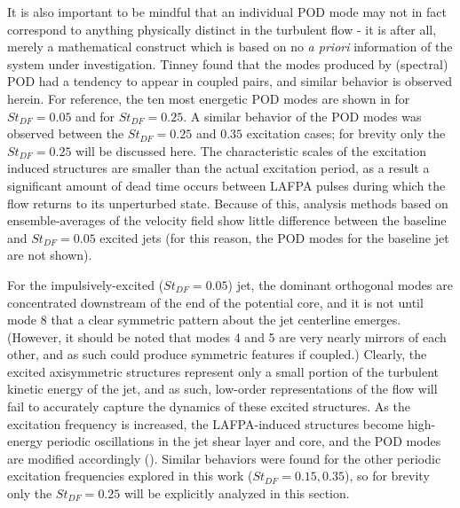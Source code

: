It is also important to be mindful that an individual POD mode may not in fact correspond to anything physically distinct in the turbulent flow - it is after all, merely a mathematical construct which is based on no \textit{a priori} information of the system under investigation.
Tinney \etal \citep{Tinney2008b} found that the modes produced by (spectral) POD had a tendency to appear in coupled pairs, and similar behavior is observed herein. 
For reference, the ten most energetic POD modes are shown in  for $St_{DF} = 0.05$ and  for $St_{DF} = 0.25$.
A similar behavior of the POD modes was observed between the $St_{DF} = 0.25$ and $0.35$ excitation cases; for brevity only the $St_{DF} = 0.25$ will be discussed here.
The characteristic scales of the excitation induced structures are smaller than the actual excitation period, as a result a significant amount of dead time occurs between LAFPA pulses during which the flow returns to its unperturbed state.
Because of this, analysis methods based on ensemble-averages of the velocity field show little difference between the baseline and $St_{DF} = 0.05$ excited jets (for this reason, the POD modes for the baseline jet are not shown).

For the impulsively-excited ($St_{DF} = 0.05$) jet, the dominant orthogonal modes are concentrated downstream of the end of the potential core, and it is not until mode 8 that a clear symmetric pattern about the jet centerline emerges. 
(However, it should be noted that modes 4 and 5 are very nearly mirrors of each other, and as such could produce symmetric features if coupled.)
Clearly, the excited axisymmetric structures represent only a small portion of the turbulent kinetic energy of the jet, and as such, low-order representations of the flow will fail to accurately capture the dynamics of these excited structures.
As the excitation frequency is increased, the LAFPA-induced structures become high-energy periodic oscillations in the jet shear layer and core, and the POD modes are modified accordingly ().
Similar behaviors were found for the other periodic excitation frequencies explored in this work ($St_{DF} = 0.15, 0.35$), so for brevity only the $St_{DF} = 0.25$ will be explicitly analyzed in this section.

